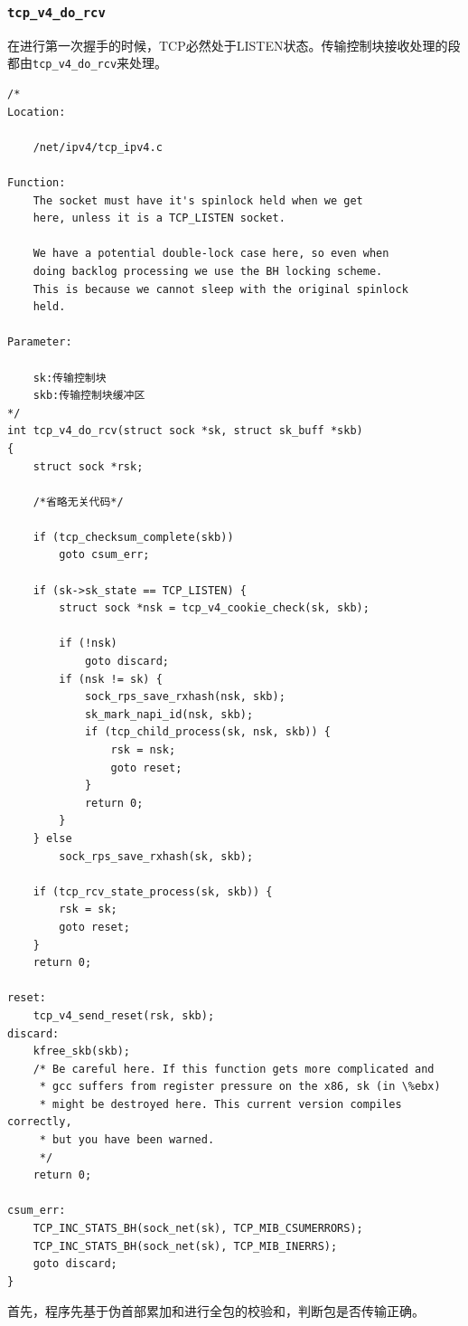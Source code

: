             \subsubsection{\texttt{tcp_v4_do_rcv}}
                在进行第一次握手的时候，TCP必然处于LISTEN状态。传输控制块接收处理的段都由\texttt{tcp_v4_do_rcv}来处理。
\begin{verbatim}
/*
Location:

	/net/ipv4/tcp_ipv4.c

Function:
	The socket must have it's spinlock held when we get
	here, unless it is a TCP_LISTEN socket.

	We have a potential double-lock case here, so even when
	doing backlog processing we use the BH locking scheme.
	This is because we cannot sleep with the original spinlock
	held.

Parameter:

	sk:传输控制块
	skb:传输控制块缓冲区
*/
int tcp_v4_do_rcv(struct sock *sk, struct sk_buff *skb)
{
    struct sock *rsk;

    /*省略无关代码*/

    if (tcp_checksum_complete(skb))
        goto csum_err;

    if (sk->sk_state == TCP_LISTEN) {
        struct sock *nsk = tcp_v4_cookie_check(sk, skb);

        if (!nsk)
            goto discard;
        if (nsk != sk) {
            sock_rps_save_rxhash(nsk, skb);
            sk_mark_napi_id(nsk, skb);
            if (tcp_child_process(sk, nsk, skb)) {
                rsk = nsk;
                goto reset;
            }
            return 0;
        }
    } else
        sock_rps_save_rxhash(sk, skb);

    if (tcp_rcv_state_process(sk, skb)) {
        rsk = sk;
        goto reset;
    }
    return 0;

reset:
    tcp_v4_send_reset(rsk, skb);
discard:
    kfree_skb(skb);
    /* Be careful here. If this function gets more complicated and
     * gcc suffers from register pressure on the x86, sk (in \%ebx)
     * might be destroyed here. This current version compiles correctly,
     * but you have been warned.
     */
    return 0;

csum_err:
    TCP_INC_STATS_BH(sock_net(sk), TCP_MIB_CSUMERRORS);
    TCP_INC_STATS_BH(sock_net(sk), TCP_MIB_INERRS);
    goto discard;
}
\end{verbatim}

                首先，程序先基于伪首部累加和进行全包的校验和，判断包是否传输正确。

